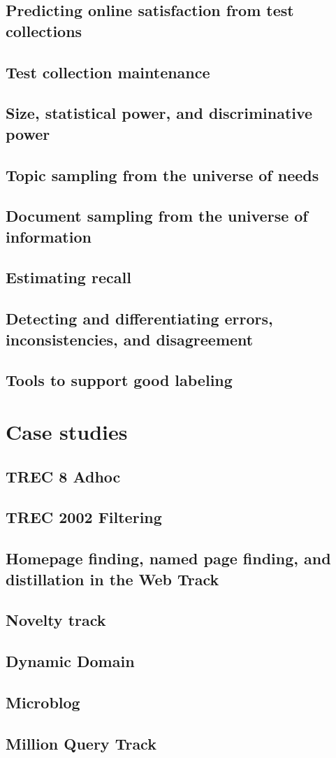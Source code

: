 \documentclass[nobib]{tufte-book}
\begin{document}
\section{Predicting online satisfaction from test collections}
\section{Test collection maintenance}
\section{Size, statistical power, and discriminative power}
\section{Topic sampling from the universe of needs}
\section{Document sampling from the universe of information}
\section{Estimating recall}
\section{Detecting and differentiating errors, inconsistencies, and disagreement}
\section{Tools to support good labeling}

\chapter{Case studies}

\section{TREC 8 Adhoc}
\section{TREC 2002 Filtering}
\section{Homepage finding, named page finding, and distillation in the Web Track}
\section{Novelty track}
\section{Dynamic Domain}
\section{Microblog}
\section{Million Query Track}



\backmatter

\printbibliography

\printindex
\end{document}
